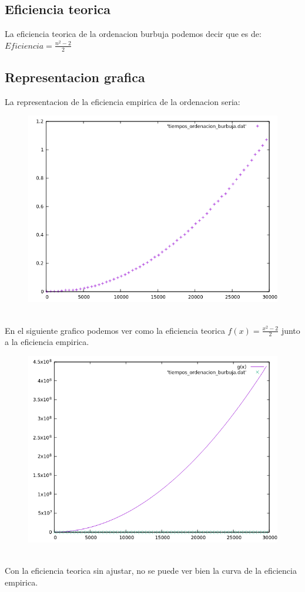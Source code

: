 \documentclass[12pt,a4psprt]{article}
\begin{document}
\subsection{Eficiencia teorica}
La eficiencia teorica de la ordenacion burbuja podemos decir que es de:\\
$Eficiencia=\frac{n^{2}-2}{2}$
\pagebreak
\subsection{Representacion grafica}
La representacion de la eficiencia empirica de la ordenacion seria:
\begin{figure}[h]
\begin{center}
	\includegraphics[scale=1]{image/grafica_1_sin_funcion.png}
\end{center}
\end{figure}
\\
En el siguiente grafico podemos ver como la eficiencia teorica
$f(x)=\frac{x^{2}-2}{2}$ junto a la eficiencia empirica.
\begin{figure}[h]
\begin{center}
	\includegraphics[scale=1]{image/grafica_1.png}
\end{center}
\end{figure}
\\
Con la eficiencia teorica sin ajustar, no se puede ver bien la curva de la eficiencia empirica.
\pagebreak
\end{document}
